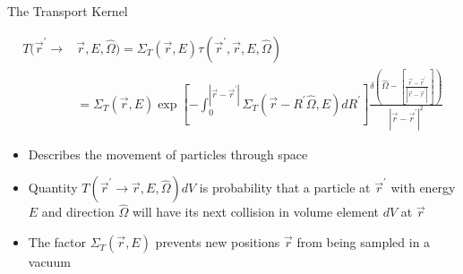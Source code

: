 \documentclass{beamer}
\begin{document}
\begin{frame}{The Transport Kernel}

  \begin{align}
    T(\vec{r}^{'} \to &\vec{r},E,\hat{\Omega}) = \Sigma_T(\vec{r},E)
    \tau(\vec{r}^{'},\vec{r},E,\hat{\Omega}) \nonumber \\
    & = \Sigma_T(\vec{r},E)
    \exp{\left[-\int_0^{|\vec{r} - \vec{r}^{'}|} 
        \Sigma_T(\vec{r}-R^{'}\hat{\Omega},E)dR^{'} \right]} %
    \frac{\delta \left(\hat{\Omega} - \left[\frac{\vec{r} - \vec{r}^{'}}
        {|\vec{r} - \vec{r}^{'}|}\right]\right)}
         {|\vec{r} - \vec{r}^{'}|^2} \nonumber
  \end{align}

  \begin{itemize}
    \item Describes the movement of particles through space
      \medskip
    \item Quantity $T(\vec{r}^{'} \to \vec{r},E,\hat{\Omega})dV$ is  
      probability that a particle at $\vec{r}^{'}$ with energy $E$ and 
      direction $\hat{\Omega}$ will have its next collision in volume element 
      $dV$ at $\vec{r}$
      \medskip
    \item The factor $\Sigma_T(\vec{r},E)$ prevents new positions $\vec{r}$ from
      being sampled in a vacuum
  \end{itemize}

\end{frame}
\end{document}
